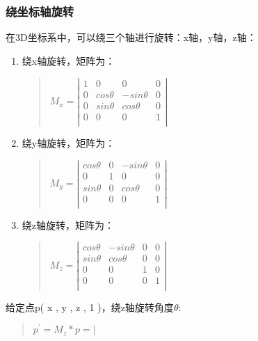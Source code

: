 \documentclass[a4paper,10pt]{article}
\begin{document}
\begin{CJK}{UTF8}{song}
\subsubsection{绕坐标轴旋转}
在3D坐标系中，可以绕三个轴进行旋转：x轴，y轴，z轴：
\begin{enumerate}
\item 绕x轴旋转，矩阵为：
\begin{quote}
\begin{math}
M_{x}=\left|
\begin{array}{cccc}
1 & 0 & 0 & 0 \\
0 & cos\theta & -sin\theta & 0 \\
0 & sin\theta & cos\theta & 0 \\
0 & 0 & 0 & 1 \\
\end{array}
\right|
\end{math}
\end{quote}
\item 绕y轴旋转，矩阵为：
\begin{quote}
\begin{math}
M_{y}=\left|
\begin{array}{cccc}
cos\theta & 0 & -sin\theta & 0  \\
0 & 1 & 0 & 0 \\
sin\theta & 0 & cos\theta & 0 \\
0 & 0 & 0 & 1 \\
\end{array}
\right| 
\end{math}
\end{quote}
\item 绕z轴旋转，矩阵为：
\begin{quote}
\begin{math}
M_{z}=\left|
\begin{array}{cccc}
cos\theta & -sin\theta & 0 & 0 \\
sin\theta & cos\theta & 0 & 0 \\
0  & 0 & 1 & 0 \\
0 & 0 & 0 & 1 \\
\end{array}
\right|
\end{math}
\end{quote}
\end{enumerate}
给定点p( x , y , z , 1 )，绕z轴旋转角度$\theta$:
\begin{quote}
\begin{math}
p^{'}=M_{z}*p=
\left|
\begin{array}{cccc}

\end{array}
\end{math}
\end{quote}
\end{CJK}
\end{document}
